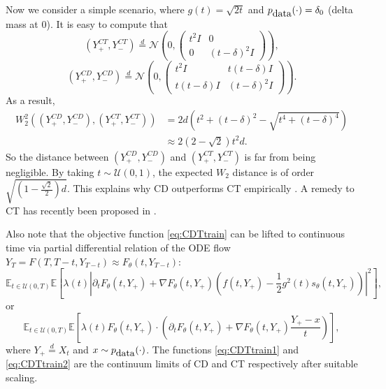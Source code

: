 \documentclass[letterpaper,11pt,reqno]{amsart}
\numberwithin{equation}{section}
\begin{document}
\quad Now we consider a simple scenario,
where $g(t) = \sqrt{2t}$ and $p_{\tiny \mbox{data}}(\cdot) = \delta_0$ (delta mass at $0$). 
It is easy to compute that
\begin{equation*}
(Y^{CT}_{+}, Y^{CT}_{-}) \stackrel{d}{=} \mathcal{N}\left(0, \begin{pmatrix}
t^2 I & 0 \\
0 & (t - \delta)^2 I
\end{pmatrix}
  \right), 
 \end{equation*}
 \begin{equation*}
 (Y^{CD}_{+}, Y^{CD}_{-}) \stackrel{d}{=} \mathcal{N}\left(0, \begin{pmatrix}
t^2 I & t(t - \delta) I \\
t(t - \delta) I & (t - \delta)^2 I
\end{pmatrix}
 \right).
 \end{equation*}
As a result,
\begin{equation}
\begin{aligned}
W^2_2((Y^{CD}_{+}, Y^{CD}_{-}), (Y^{CT}_{+}, Y^{CT}_{-}))
& = 2d \left(t^2 + (t - \delta)^2 - \sqrt{t^4 + (t - \delta)^4} \right) \\
& \approx  2(2 - \sqrt{2})  t^2 d.
\end{aligned}
\end{equation}
So the distance between $(Y^{CD}_{+}, Y^{CD}_{-})$ 
and $(Y^{CT}_{+}, Y^{CT}_{-})$
is far from being negligible. 
By taking $t \sim \mathcal{U}(0,1)$,
the expected $W_2$ distance is of order
$\sqrt{\left(1 - \frac{\sqrt{2}}{2}\right)d}$.
This explains why CD outperforms CT empirically \cite{SDC23}.
A remedy to CT has recently been proposed in \cite{song2023improved}.

\quad Also note that the objective function \eqref{eq:CDTtrain}
can be lifted to continuous time via partial differential relation
of the ODE flow $Y_T = F(T, T-t, Y_{T-t}) \approx F_\theta(t, Y_{T-t}) $:
\begin{equation}
\label{eq:CDTtrain1}
\mathbb{E}_{t \in \mathcal{U}(0,T)} \mathbb{E}\left[\lambda(t) \left|\partial_t F_\theta(t, Y_{+}) + \nabla F_{\theta}(t, Y_+)\left(f(t, Y_+) - \frac{1}{2} g^2(t) s_\theta(t, Y_+)\right) \right|^2\right],
\end{equation}
or
\begin{equation}
\label{eq:CDTtrain2}
\mathbb{E}_{t \in \mathcal{U}(0,T)} \mathbb{E}\left[\lambda(t) F_\theta(t, Y_+) \cdot \left(\partial_t F_\theta(t, Y_{+}) + \nabla F_{\theta}(t, Y_+) \frac{Y_+ - x}{t} \right)\right],
\end{equation}
where $Y_+ \stackrel{d}{=} X_t$ and $x \sim p_{\tiny \mbox{data}}(\cdot)$.
The functions \eqref{eq:CDTtrain1} and \eqref{eq:CDTtrain2}
are the continuum limits 
of CD and CT respectively
after suitable scaling. 
\end{document}
